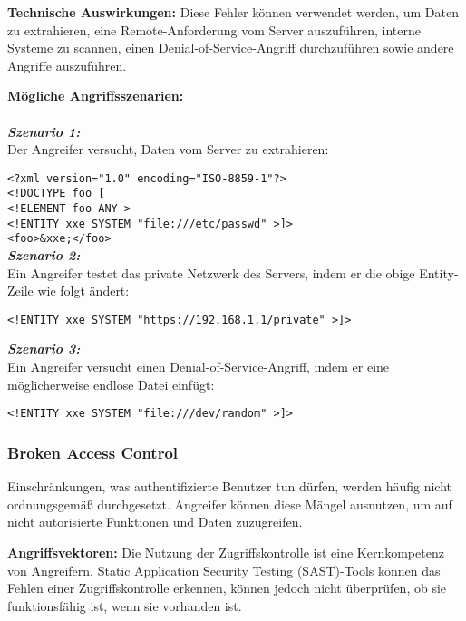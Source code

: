 \textbf{Technische Auswirkungen:} Diese Fehler können verwendet werden, um Daten zu extrahieren, eine Remote-Anforderung vom Server auszuführen, interne Systeme zu scannen, einen Denial-of-Service-Angriff durchzuführen sowie andere Angriffe auszuführen\cite[10]{owasp17top10}.

\textbf{Mögliche Angriffsszenarien:}\\
\\
\textbf{\textit{Szenario 1:}}\\
Der Angreifer versucht, Daten vom Server zu extrahieren\cite[10]{owasp17top10}:

\texttt{<?xml version="1.0" encoding="ISO-8859-1"?>\\
	<!DOCTYPE foo [\\
	<!ELEMENT foo ANY >\\
	<!ENTITY xxe SYSTEM "file:///etc/passwd" >]>\\
	<foo>\&xxe;</foo>}\\

\textbf{\textit{Szenario 2:}}\\
Ein Angreifer testet das private Netzwerk des Servers, indem er die obige Entity-Zeile wie folgt ändert\cite[10]{owasp17top10}:

\texttt{<!ENTITY xxe SYSTEM "https://192.168.1.1/private" >]>}



\textbf{\textit{Szenario 3:}}\\
Ein Angreifer versucht einen Denial-of-Service-Angriff, indem er eine möglicherweise endlose Datei einfügt\cite[10]{owasp17top10}:

\texttt{<!ENTITY xxe SYSTEM "file:///dev/random" >]>}

\subsubsection{Broken Access Control}

Einschränkungen, was authentifizierte Benutzer tun dürfen, werden häufig nicht ordnungsgemäß durchgesetzt. Angreifer können diese Mängel ausnutzen, um auf nicht autorisierte Funktionen und Daten zuzugreifen\cite[6]{owasp17top10}.

\textbf{Angriffsvektoren:} Die Nutzung der Zugriffskontrolle ist eine Kernkompetenz von Angreifern. Static Application Security Testing (SAST)-Tools können das Fehlen einer Zugriffskontrolle erkennen, können jedoch nicht überprüfen, ob sie funktionsfähig ist, wenn sie vorhanden ist\cite[11]{owasp17top10}.

